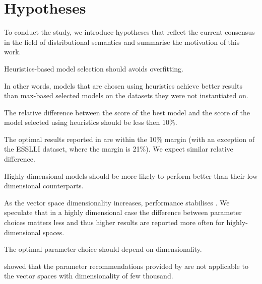 \section{Hypotheses}
\label{sec:hypotheses}

To conduct the study, we introduce hypotheses that reflect the current consensus in the field of distributional semantics and summarise the motivation of this work.

\begin{hyp}
\label{hyp:overfitting}
Heuristics-based model selection should avoids overfitting.
\end{hyp}

In other words, models that are chosen using heuristics achieve better results than max-based selected models on the datasets they were not instantiated on.

\begin{hyp}
\label{hyp:10percent}
The relative difference between the score of the best model and the score of the model selected using heuristics should be less then 10\%.
\end{hyp}

The optimal results reported in  are within the 10\% margin (with an exception of the ESSLLI dataset, where the margin is 21\%). We expect similar relative difference.

\begin{hyp}
\label{hyp:var}
Highly dimensional models should be more likely to perform better than their low dimensional counterparts.
\end{hyp}

As the vector space dimensionality increases, performance stabilises \cite{kiela-clark:2014:CVSC,BullinariaLevy2012,lapesa2014large}. We speculate that in a highly dimensional case the difference between parameter choices matters less and thus higher results are reported more often for highly-dimensional spaces.

\begin{hyp}
\label{hyp:dimen}
The optimal parameter choice should depend on dimensionality.
\end{hyp}

 showed that the parameter recommendations provided by  are not applicable to the vector spaces with dimensionality of few thousand.


